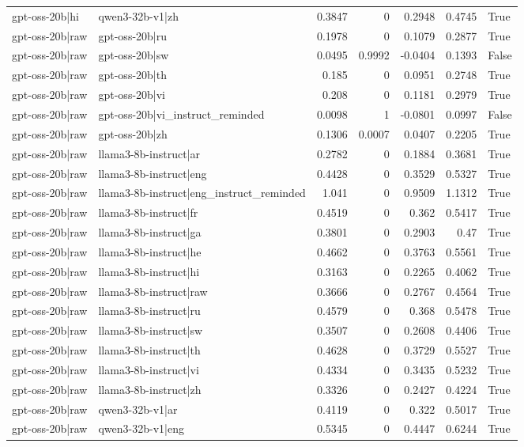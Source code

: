 \begin{table}
\begin{tabular}{l l r r r r l}
gpt-oss-20b|hi & qwen3-32b-v1|zh & 0.3847 & 0 & 0.2948 & 0.4745 & True \\
gpt-oss-20b|raw & gpt-oss-20b|ru & 0.1978 & 0 & 0.1079 & 0.2877 & True \\
gpt-oss-20b|raw & gpt-oss-20b|sw & 0.0495 & 0.9992 & -0.0404 & 0.1393 & False \\
gpt-oss-20b|raw & gpt-oss-20b|th & 0.185 & 0 & 0.0951 & 0.2748 & True \\
gpt-oss-20b|raw & gpt-oss-20b|vi & 0.208 & 0 & 0.1181 & 0.2979 & True \\
gpt-oss-20b|raw & gpt-oss-20b|vi_instruct_reminded & 0.0098 & 1 & -0.0801 & 0.0997 & False \\
gpt-oss-20b|raw & gpt-oss-20b|zh & 0.1306 & 0.0007 & 0.0407 & 0.2205 & True \\
gpt-oss-20b|raw & llama3-8b-instruct|ar & 0.2782 & 0 & 0.1884 & 0.3681 & True \\
gpt-oss-20b|raw & llama3-8b-instruct|eng & 0.4428 & 0 & 0.3529 & 0.5327 & True \\
gpt-oss-20b|raw & llama3-8b-instruct|eng_instruct_reminded & 1.041 & 0 & 0.9509 & 1.1312 & True \\
gpt-oss-20b|raw & llama3-8b-instruct|fr & 0.4519 & 0 & 0.362 & 0.5417 & True \\
gpt-oss-20b|raw & llama3-8b-instruct|ga & 0.3801 & 0 & 0.2903 & 0.47 & True \\
gpt-oss-20b|raw & llama3-8b-instruct|he & 0.4662 & 0 & 0.3763 & 0.5561 & True \\
gpt-oss-20b|raw & llama3-8b-instruct|hi & 0.3163 & 0 & 0.2265 & 0.4062 & True \\
gpt-oss-20b|raw & llama3-8b-instruct|raw & 0.3666 & 0 & 0.2767 & 0.4564 & True \\
gpt-oss-20b|raw & llama3-8b-instruct|ru & 0.4579 & 0 & 0.368 & 0.5478 & True \\
gpt-oss-20b|raw & llama3-8b-instruct|sw & 0.3507 & 0 & 0.2608 & 0.4406 & True \\
gpt-oss-20b|raw & llama3-8b-instruct|th & 0.4628 & 0 & 0.3729 & 0.5527 & True \\
gpt-oss-20b|raw & llama3-8b-instruct|vi & 0.4334 & 0 & 0.3435 & 0.5232 & True \\
gpt-oss-20b|raw & llama3-8b-instruct|zh & 0.3326 & 0 & 0.2427 & 0.4224 & True \\
gpt-oss-20b|raw & qwen3-32b-v1|ar & 0.4119 & 0 & 0.322 & 0.5017 & True \\
gpt-oss-20b|raw & qwen3-32b-v1|eng & 0.5345 & 0 & 0.4447 & 0.6244 & True \\

\end{tabular}
\end{table}
